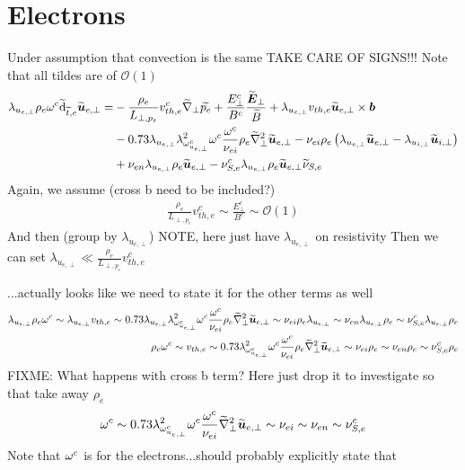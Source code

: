 \section{Electrons}
%
Under assumption that convection is the same
TAKE CARE OF SIGNS!!!
Note that all tildes are of $\mathcal{O}(1)$
%
\begin{align*}
 \lambda_{u_{e,\perp}}
 \rho_e
 \omega^c
 \widetilde{ \text{d}}_{\widetilde{ t},e} \widetilde{ \boldsymbol{u}}_{e,\perp}
 =&
 -
 \frac{\rho_e}{L_{\perp, p_e}}v^c_{th,e}
 \widetilde{ \nabla}_\perp \widetilde{ p_e}
 +
 \frac{E_\perp^c}{B^c}
 \frac{\widetilde{ \boldsymbol{E}}_\perp}{\widetilde{ B}}
 +
 \lambda_{u_{e,\perp}}
 v_{th,e}
 \widetilde{ \boldsymbol{u}}_{e,\perp}\times\boldsymbol{b}
 \\&
 -
0.73
 \lambda_{u_{e,\perp}}
\lambda_{\omega^c_{u_{e,\perp}}}^2
 \omega^c
\frac{\omega^c}{\nu_{ei} }
\rho_e
\widetilde{ \nabla}_\perp^2\widetilde{ \boldsymbol{u}}_{e,\perp}
-
\nu_{ei}
\rho_e
\left( \lambda_{u_{e,\perp}}\widetilde{ \boldsymbol{u}}_{e,\perp}-\lambda_{u_{i,\perp}}\widetilde{ \boldsymbol{u}}_{i,\perp}\right)
 \\&
 +
\nu_{e n}\lambda_{u_{e,\perp}}\rho_e\widetilde{ \boldsymbol{u}}_{e,\perp}
-
\nu^c_{S,e}\lambda_{u_{e,\perp}}\rho_e\widetilde{ \boldsymbol{u}}_{e,\perp} \widetilde{ \nu}_{S,e}
\end{align*}
%
Again, we assume (cross b need to be included?)
%
\begin{align*}
 \frac{\rho_e}{L_{\perp, p_e}}v^c_{th,e}
 \sim
 \frac{E_\perp^c}{B^c}
 \sim
 \mathcal{O}(1)
\end{align*}
%
And then (group by $\lambda_{u_{e,\perp}}$)
NOTE, here just have $\lambda_{u_{e,\perp}}$ on resistivity
Then we can set
$\lambda_{u_{e,\perp}} \ll \frac{\rho_e}{L_{\perp, p_e}}v^c_{th,e}$

...actually looks like we need to state it for the other terms as well
%
\begin{align*}
 \lambda_{u_{e,\perp}}
 \rho_e
 \om^c
%
 \sim
 \lambda_{u_{e,\perp}}
 v_{th,e}
%
 \sim
0.73
 \lambda_{u_{e,\perp}}
\lambda_{\om^c_{u_{e,\perp}}}^2
 \om^c
\frac{\om^c}{\nu_{ei} }
\rho_e
\wt{\grad}_\perp^2\wt{\ve{u}}_{e,\perp}
%
 \sim
\nu_{ei}
\rho_e
\lambda_{u_{e,\perp}}
%
 \sim
\nu_{e n}\lambda_{u_{e,\perp}}\rho_e
%
 \sim
\nu^c_{S,e}\lambda_{u_{e,\perp}}\rho_e
\\
%
%
%
 \rho_e
 \om^c
%
 \sim
 v_{th,e}
%
 \sim
0.73
\lambda_{\om^c_{u_{e,\perp}}}^2
 \om^c
\frac{\om^c}{\nu_{ei} }
\rho_e
\wt{\grad}_\perp^2\wt{\ve{u}}_{e,\perp}
%
 \sim
\nu_{ei}
\rho_e
%
 \sim
\nu_{e n}
\rho_e
%
 \sim
\nu^c_{S,e}
\rho_e
\\
\end{align*}
%
FIXME: What happens with cross b term? Here just drop it to investigate
so that take away $\rho_e$
%
\begin{align*}
 \om^c
%
 \sim
0.73
\lambda_{\om^c_{u_{e,\perp}}}^2
 \om^c
\frac{\om^c}{\nu_{ei} }
\wt{\grad}_\perp^2\wt{\ve{u}}_{e,\perp}
%
 \sim
\nu_{ei}
%
 \sim
\nu_{e n}
%
 \sim
\nu^c_{S,e}
\end{align*}
%
Note that $\omega^c$ is for the electrons...should probably explicitly state that

